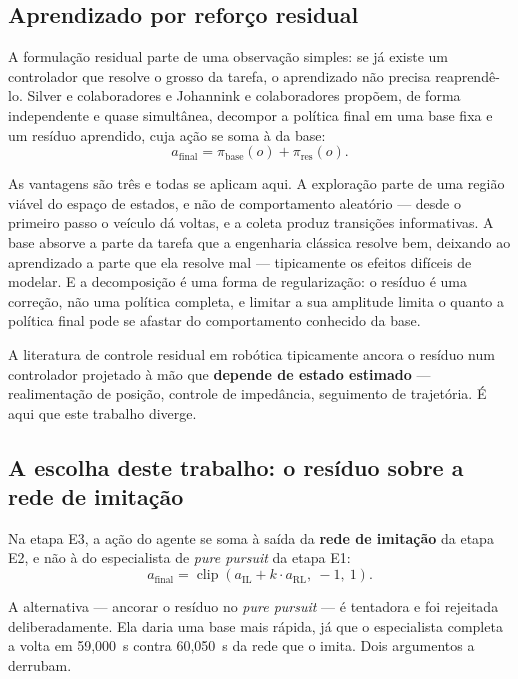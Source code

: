 \subsection{Aprendizado por reforço residual}

A formulação residual parte de uma observação simples: se já existe um
controlador que resolve o grosso da tarefa, o aprendizado não precisa
reaprendê-lo. Silver e colaboradores \cite{Silver2018ResidualPolicy} e Johannink
e colaboradores \cite{Johannink2019Residual} propõem, de forma independente e
quase simultânea, decompor a política final em uma base fixa e um resíduo
aprendido, cuja ação se soma à da base:
\[
    a_{\text{final}} = \pi_{\text{base}}(o) + \pi_{\text{res}}(o).
\]

As vantagens são três e todas se aplicam aqui. A exploração parte de uma região
viável do espaço de estados, e não de comportamento aleatório --- desde o
primeiro passo o veículo dá voltas, e a coleta produz transições informativas. A
base absorve a parte da tarefa que a engenharia clássica resolve bem, deixando ao
aprendizado a parte que ela resolve mal --- tipicamente os efeitos difíceis de
modelar. E a decomposição é uma forma de regularização: o resíduo é uma correção,
não uma política completa, e limitar a sua amplitude limita o quanto a política
final pode se afastar do comportamento conhecido da base.

A literatura de controle residual em robótica \cite{Johannink2019Residual}
tipicamente ancora o resíduo num controlador projetado à mão que \textbf{depende
de estado estimado} --- realimentação de posição, controle de impedância,
seguimento de trajetória. É aqui que este trabalho diverge.

\subsection{A escolha deste trabalho: o resíduo sobre a rede de imitação}

Na etapa E3, a ação do agente se soma à saída da \textbf{rede de imitação} da
etapa E2, e não à do especialista de \textit{pure pursuit} da etapa E1:
\[
    a_{\text{final}} = \operatorname{clip}\left(a_{\text{IL}} + k \cdot a_{\text{RL}},\ -1,\ 1\right).
\]

A alternativa --- ancorar o resíduo no \textit{pure pursuit} --- é tentadora e
foi rejeitada deliberadamente. Ela daria uma base mais rápida, já que o
especialista completa a volta em 59,000~s contra 60,050~s da rede que o imita.
Dois argumentos a derrubam.

